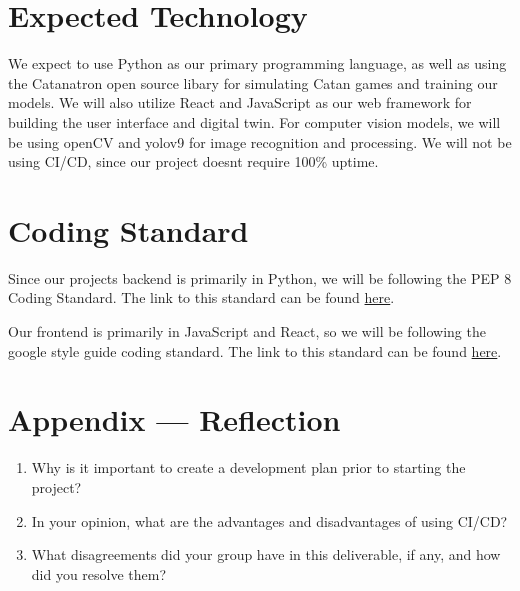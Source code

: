 \documentclass{article}
\begin{document}
\section{Expected Technology}

\raggedright
We expect to use Python as our primary programming 
language, as well as using the Catanatron open source 
libary for simulating Catan games and training our models.
We will also utilize React and JavaScript as 
our web framework for building the user interface and 
digital twin. For computer vision models, we will be using
openCV and yolov9 for image recognition and processing. We
will not be using CI/CD, since our project doesnt require 100\% uptime.


\section{Coding Standard}

Since our projects backend is primarily in Python, we will be following the PEP 8 Coding
Standard. The link to this standard can be found
\href{https://peps.python.org/pep-0008/}{here}.

\medskip

Our frontend is primarily in JavaScript and React, so we will be following the google style guide
coding standard. The link to this standard can be found \href{https://google.github.io/styleguide/jsguide.html}{here}.

\newpage{}

\section*{Appendix --- Reflection}




\begin{enumerate}
    \item Why is it important to create a development plan prior to starting the
    project?
    \item In your opinion, what are the advantages and disadvantages of using
    CI/CD?
    \item What disagreements did your group have in this deliverable, if any,
    and how did you resolve them?
\end{enumerate}
\end{document}
